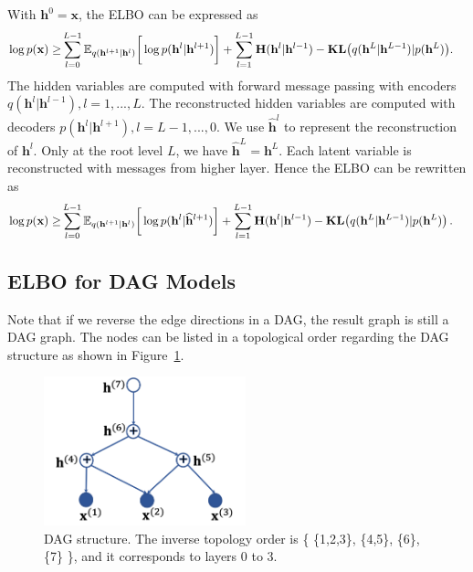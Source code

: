 \documentclass[twoside]{article}
\begin{document}
With $\mathbf{h}^0 = \mathbf{x}$,  the ELBO can be expressed as
\begin{align*}
\log p(\mathbf{x}) \geq &   \sum_{l=0}^{L-1}  \mathbb{E}_{q(\mathbf{h}^{l+1}|\mathbf{h}^l)} \bigg[ \log p( \mathbf{h}^{l}|  \mathbf{h}^{l+1})   \bigg] +  \sum_{l=1}^{L-1}   \textbf{\text{H}}(\mathbf{h}^l | \mathbf{h}^{l-1} ) -   \textbf{\text{KL}}\big(q(\mathbf{h}^L | \mathbf{h}^{L-1} )   | p(\mathbf{h}^L)  \big) . 
 \end{align*}
The hidden variables are computed with forward message passing with encoders $q(\mathbf{h}^l | \mathbf{h}^{l-1}), l = 1,..., L$. 
The reconstructed hidden variables are computed with decoders $p(\mathbf{h}^l | \mathbf{h}^{l+1}), l = L-1, ..., 0$. 
We use $\widehat{\mathbf{h}}^l$ to represent the reconstruction of $\mathbf{h}^l$. 
Only at the root level $L$, we have $\widehat{\mathbf{h}}^L = \mathbf{h}^L$. 
Each latent variable is reconstructed with messages from higher layer. 
Hence the ELBO can be rewritten as 
\begin{align*}
\log p(\mathbf{x}) \geq &   \sum_{l=0}^{L-1}  \mathbb{E}_{q(\mathbf{h}^{l+1}|\mathbf{h}^l)} \bigg[ \log p( \mathbf{h}^{l}|  \widehat{\mathbf{h}}^{l+1})   \bigg] +  \sum_{l=1}^{L-1}   \textbf{\text{H}}(\mathbf{h}^l | \mathbf{h}^{l-1} ) -   \textbf{\text{KL}}\big(q(\mathbf{h}^L | \mathbf{h}^{L-1} )   | p(\mathbf{h}^L)  \big) \, .
 \end{align*}


\subsection{ELBO for DAG Models}\label{appd:dag_elbo}

Note that if we reverse the edge directions in a DAG, the  result graph is still a DAG graph.  
The nodes can be listed in a topological order regarding the DAG structure as shown in Figure~\ref{fig:dag}. 
\begin{figure}[H]
    \centering
    \includegraphics[width=2.3in]{fig/dag.png}
    \caption{DAG structure. The inverse topology order is \big\{ \{1,2,3\}, \{4,5\}, \{6\},  \{7\} \big\}, and it corresponds to layers 0 to 3.  }
    \label{fig:dag}
\end{figure}
\end{document}
